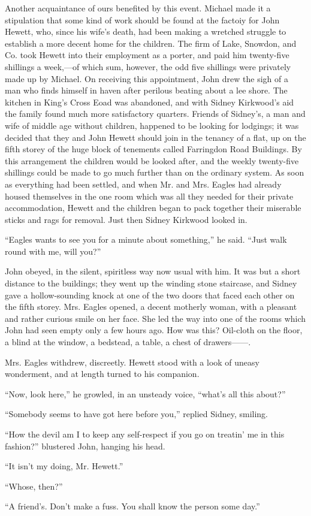 Another acquaintance of ours benefited by this event. Michael made it a
stipulation that some kind of work should be found at the factoiy for
John Hewett, who, since his wife's death, had been making a wretched
struggle to establish a more decent home for the children. The firm of
Lake, Snowdon, and Co. took Hewett into their employment as a porter,
and paid him twenty-five shillings a week,---of which sum, however, the
odd five shillings were privately made up by Michael. On receiving this
appointment, John drew the sigh of a man who finds himself in haven
after perilous beating about a lee shore. The kitchen in King's Cross
Eoad was abandoned, and with Sidney Kirkwood's aid the family {}found
much more satisfactory quarters. Friends of Sidney's, a man and wife of
middle age without children, happened to be looking for lodgings; it was
decided that they and John Hewett should join in the tenancy of a flat,
up on the fifth storey of the huge block of tenements called Farringdon
Road Buildings. By this arrangement the children would be looked after,
and the weekly twenty-five shillings could be made to go much further
than on the ordinary system. As soon as everything had been settled, and
when Mr. and Mrs. Eagles had already housed themselves in the one room
which was all they needed for their private accommodation, Hewett and
the children began to pack together their miserable sticks and rags for
removal. Just then Sidney Kirkwood looked in.

``Eagles wants to see you for a minute about something,'' he said.
``Just walk round with me, will you?''

John obeyed, in the silent, spiritless way now usual with him. It was
but a short distance to the buildings; they went up the {}winding stone
staircase, and Sidney gave a hollow-sounding knock at one of the two
doors that faced each other on the fifth storey. Mrs. Eagles opened, a
decent motherly woman, with a pleasant and rather curious smile on her
face. She led the way into one of the rooms which John had seen empty
only a few hours ago. How was this? Oil-cloth on the floor, a blind at
the window, a bedstead, a table, a chest of {drawers{{------}}.}

Mrs. Eagles withdrew, discreetly. Hewett stood with a look of uneasy
wonderment, and at length turned to his companion.

``Now, look here,'' he growled, in an unsteady voice, ``what's all this
about?''

``Somebody seems to have got here before you,'' replied Sidney, smiling.

``How the devil am I to keep any self-respect if you go on treatin' me
in this fashion?'' blustered John, hanging his head.

``It isn't my doing, Mr. Hewett.''

``Whose, then?''

``A friend's. Don't make a fuss. You shall know the person some day.''
